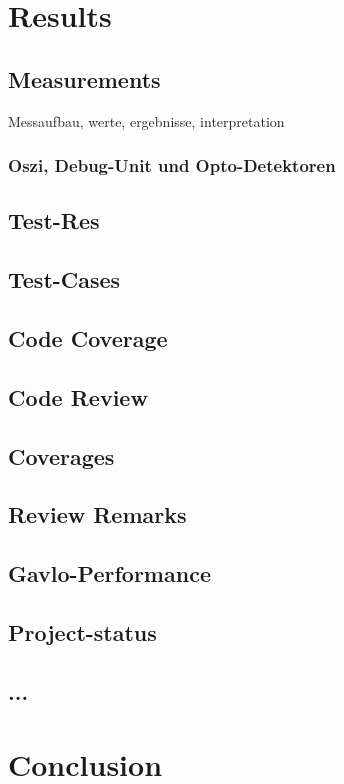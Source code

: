 \documentclass[master,english,smartquotes,apa]{hgbthesis}
\begin{document}
	\chapter{Results}
	\label{cha:Results}
	\section{Measurements}
		Messaufbau, werte, ergebnisse, interpretation
		\subsection{Oszi, Debug-Unit und Opto-Detektoren}
		\section{Test-Res}
		\section{Test-Cases}
		\section{Code Coverage}
		\section{Code Review}
		\section{Coverages}
		\section{Review Remarks}
		\section{Gavlo-Performance}
		\section{Project-status}
		\section{ ... }
	\chapter{Conclusion}
	\label{cha:Conclusion}


% 
% 
% 
% 
% 
\end{document}

